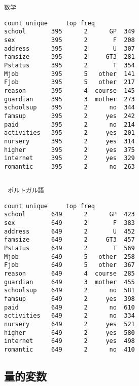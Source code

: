 \documentclass[9pt]{ltjsarticle}
\begin{document}
\newpage
    \begin{Verbatim}[commandchars=\\\{\}]
数学
    \end{Verbatim}

    
    \begin{Verbatim}[commandchars=\\\{\}]
           count unique     top freq
school       395      2      GP  349
sex          395      2       F  208
address      395      2       U  307
famsize      395      2     GT3  281
Pstatus      395      2       T  354
Mjob         395      5   other  141
Fjob         395      5   other  217
reason       395      4  course  145
guardian     395      3  mother  273
schoolsup    395      2      no  344
famsup       395      2     yes  242
paid         395      2      no  214
activities   395      2     yes  201
nursery      395      2     yes  314
higher       395      2     yes  375
internet     395      2     yes  329
romantic     395      2      no  263
    \end{Verbatim}

    
    \begin{Verbatim}[commandchars=\\\{\}]

 ポルトガル語
    \end{Verbatim}

    
    \begin{Verbatim}[commandchars=\\\{\}]
           count unique     top freq
school       649      2      GP  423
sex          649      2       F  383
address      649      2       U  452
famsize      649      2     GT3  457
Pstatus      649      2       T  569
Mjob         649      5   other  258
Fjob         649      5   other  367
reason       649      4  course  285
guardian     649      3  mother  455
schoolsup    649      2      no  581
famsup       649      2     yes  398
paid         649      2      no  610
activities   649      2      no  334
nursery      649      2     yes  521
higher       649      2     yes  580
internet     649      2     yes  498
romantic     649      2      no  410
    \end{Verbatim}

    \newpage
    \hypertarget{ux91cfux7684ux5909ux6570}{%
\subsection{量的変数}\label{ux91cfux7684ux5909ux6570}}
\end{document}
